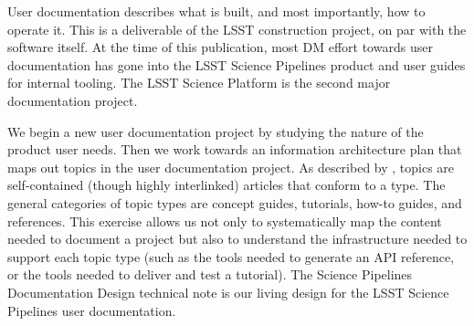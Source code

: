 User documentation describes what is built, and most importantly, how to operate it.
This is a deliverable of the LSST construction project, on par with the software itself.
At the time of this publication, most DM effort towards user documentation has gone into the LSST Science Pipelines product\cite{pipelines-guide} and user guides for internal tooling.
The LSST Science Platform\cite{LSE-319} is the second major documentation project.

We begin a new user documentation project by studying the nature of the product user needs.
Then we work towards an information architecture plan that maps out topics in the user documentation project.
As described by , topics are self-contained (though highly interlinked) articles that conform to a type.
The general categories of topic types are concept guides, tutorials, how-to guides, and references.\cite{Procida:2017}
This exercise allows us not only to systematically map the content needed to document a project but also to understand the infrastructure needed to support each topic type (such as the tools needed to generate an API reference, or the tools needed to deliver and test a tutorial).
The Science Pipelines Documentation Design\cite{DMTN-030} technical note is our living design for the LSST Science Pipelines user documentation.
